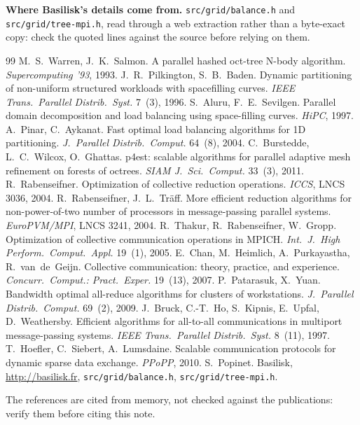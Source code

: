 \documentclass[10pt,a4paper]{article}
\theoremstyle{definition}
\newcommand{\fn}[1]{\texttt{#1}}
\begin{document}
\textbf{Where Basilisk's details come from.} \fn{src/grid/balance.h} and
\fn{src/grid/tree-mpi.h}, read through a web extraction rather than a
byte-exact copy: check the quoted lines against the source before relying
on them.

\begin{thebibliography}{99}
\small
{} M.~S.~Warren, J.~K.~Salmon. A parallel hashed oct-tree
  N-body algorithm. \emph{Supercomputing '93}, 1993.
 J.~R.~Pilkington, S.~B.~Baden. Dynamic partitioning
  of non-uniform structured workloads with spacefilling curves.
  \emph{IEEE Trans.\ Parallel Distrib.\ Syst.} 7~(3), 1996.
 S.~Aluru, F.~E.~Sevilgen. Parallel domain decomposition
  and load balancing using space-filling curves. \emph{HiPC}, 1997.
 A.~Pinar, C.~Aykanat. Fast optimal load balancing
  algorithms for 1D partitioning. \emph{J.\ Parallel Distrib.\ Comput.}
  64~(8), 2004.
 C.~Burstedde, L.~C.~Wilcox, O.~Ghattas. p4est: scalable
  algorithms for parallel adaptive mesh refinement on forests of
  octrees. \emph{SIAM J.\ Sci.\ Comput.} 33~(3), 2011.
 R.~Rabenseifner. Optimization of collective
  reduction operations. \emph{ICCS}, LNCS 3036, 2004.
 R.~Rabenseifner, J.~L.~Tr\"aff. More efficient
  reduction algorithms for non-power-of-two number of processors in
  message-passing parallel systems. \emph{EuroPVM/MPI}, LNCS 3241, 2004.
 R.~Thakur, R.~Rabenseifner, W.~Gropp. Optimization of
  collective communication operations in MPICH. \emph{Int.\ J.\ High
  Perform.\ Comput.\ Appl.} 19~(1), 2005.
 E.~Chan, M.~Heimlich, A.~Purkayastha, R.~van~de~Geijn.
  Collective communication: theory, practice, and experience.
  \emph{Concurr.\ Comput.: Pract.\ Exper.} 19~(13), 2007.
 P.~Patarasuk, X.~Yuan. Bandwidth optimal all-reduce
  algorithms for clusters of workstations. \emph{J.\ Parallel Distrib.\
  Comput.} 69~(2), 2009.
 J.~Bruck, C.-T.~Ho, S.~Kipnis, E.~Upfal, D.~Weathersby.
  Efficient algorithms for all-to-all communications in multiport
  message-passing systems. \emph{IEEE Trans.\ Parallel Distrib.\ Syst.}
  8~(11), 1997.
 T.~Hoefler, C.~Siebert, A.~Lumsdaine. Scalable
  communication protocols for dynamic sparse data exchange. \emph{PPoPP},
  2010.
 S.~Popinet. Basilisk, \url{http://basilisk.fr},
  \fn{src/grid/balance.h}, \fn{src/grid/tree-mpi.h}.
\end{thebibliography}

\noindent\footnotesize The references are cited from memory, not checked
against the publications: verify them before citing this note.
\end{document}
